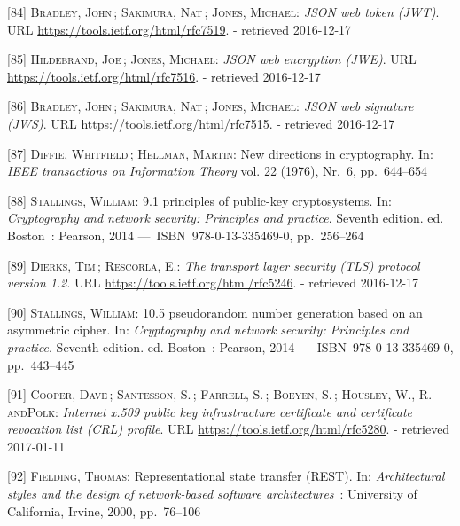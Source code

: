 \documentclass[12pt,english,a4paper,titlepage,cleardoublepage=empty,dottedtoc]{report}
\begin{document}
\hypertarget{ref-web_spec_json-web-token}{}
{[}84{]} \textsc{Bradley, John}\,; \textsc{Sakimura, Nat}\,;
\textsc{Jones, Michael}: \emph{JSON web token (JWT)}. URL
\url{https://tools.ietf.org/html/rfc7519}. - retrieved 2016-12-17

\hypertarget{ref-web_spec_json-web-encryption}{}
{[}85{]} \textsc{Hildebrand, Joe}\,; \textsc{Jones, Michael}: \emph{JSON
web encryption (JWE)}. URL \url{https://tools.ietf.org/html/rfc7516}. -
retrieved 2016-12-17

\hypertarget{ref-web_spec_json-web-signature}{}
{[}86{]} \textsc{Bradley, John}\,; \textsc{Sakimura, Nat}\,;
\textsc{Jones, Michael}: \emph{JSON web signature (JWS)}. URL
\url{https://tools.ietf.org/html/rfc7515}. - retrieved 2016-12-17

\hypertarget{ref-paper_1976_d-h-key-exchange}{}
{[}87{]} \textsc{Diffie, Whitfield}\,; \textsc{Hellman, Martin}: New
directions in cryptography. In: \emph{IEEE transactions on Information
Theory} vol. 22 (1976), Nr.~6, pp.~644--654

\hypertarget{ref-book_2014_chapter-9-1-public-key-crypto}{}
{[}88{]} \textsc{Stallings, William}: 9.1 principles of public-key
cryptosystems. In: \emph{Cryptography and network security: Principles
and practice}. Seventh edition. ed. Boston~: Pearson, 2014
---~ISBN~978-0-13-335469-0, pp.~256--264

\hypertarget{ref-web_spec_tls}{}
{[}89{]} \textsc{Dierks, Tim}\,; \textsc{Rescorla, E.}: \emph{The
transport layer security (TLS) protocol version 1.2}. URL
\url{https://tools.ietf.org/html/rfc5246}. - retrieved 2016-12-17

\hypertarget{ref-book_2014_chapter-14-5-pki}{}
{[}90{]} \textsc{Stallings, William}: 10.5 pseudorandom number
generation based on an asymmetric cipher. In: \emph{Cryptography and
network security: Principles and practice}. Seventh edition. ed.
Boston~: Pearson, 2014 ---~ISBN~978-0-13-335469-0, pp.~443--445

\hypertarget{ref-web_spec_x509}{}
{[}91{]} \textsc{Cooper, Dave}\,; \textsc{Santesson, S.}\,;
\textsc{Farrell, S.}\,; \textsc{Boeyen, S.}\,; \textsc{Housley, W.,
\textnormal{R. andPolk}}: \emph{Internet x.509 public key infrastructure
certificate and certificate revocation list (CRL) profile}. URL
\url{https://tools.ietf.org/html/rfc5280}. - retrieved 2017-01-11

\hypertarget{ref-web_spec_rest}{}
{[}92{]} \textsc{Fielding, Thomas}: Representational state transfer
(REST). In: \emph{Architectural styles and the design of network-based
software architectures}~: University of California, Irvine, 2000,
pp.~76--106
\end{document}
